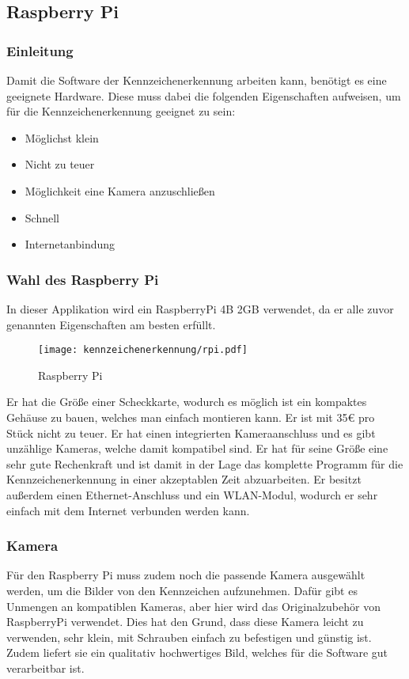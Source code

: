 \subsection{Raspberry Pi}

\subsubsection{Einleitung}
Damit die Software der Kennzeichenerkennung arbeiten kann, benötigt es eine geeignete Hardware. Diese muss dabei die folgenden Eigenschaften 
aufweisen, um für die Kennzeichenerkennung geeignet zu sein:

\begin{itemize}
    \item Möglichst klein
    \item Nicht zu teuer 
    \item Möglichkeit eine Kamera anzuschließen 
    \item Schnell 
    \item Internetanbindung
\end{itemize}

\subsubsection{Wahl des Raspberry Pi}
In dieser Applikation wird ein RaspberryPi 4B 2GB verwendet, da er alle zuvor genannten Eigenschaften am besten erfüllt.\\

\begin{figure}[H]
    \centering
    \texttt{[image: kennzeichenerkennung/rpi.pdf]}
    \caption{Raspberry Pi}
\end{figure}

Er hat die Größe einer Scheckkarte, wodurch es möglich ist ein kompaktes Gehäuse zu bauen, welches man einfach montieren kann. 
Er ist mit 35€ pro Stück nicht zu teuer. Er hat einen integrierten Kameraanschluss und es gibt unzählige Kameras, welche damit 
kompatibel sind. Er hat für seine Größe eine sehr gute Rechenkraft und ist damit in der Lage das komplette Programm für die 
Kennzeichenerkennung in einer akzeptablen Zeit abzuarbeiten. Er besitzt außerdem einen Ethernet-Anschluss und ein WLAN-Modul, 
wodurch er sehr einfach mit dem Internet verbunden werden kann.

\subsubsection{Kamera}
Für den Raspberry Pi muss zudem noch die passende Kamera ausgewählt werden, um die Bilder von den Kennzeichen aufzunehmen. 
Dafür gibt es Unmengen an kompatiblen Kameras, aber hier wird das Originalzubehör von RaspberryPi verwendet. Dies hat den Grund, 
dass diese Kamera leicht zu verwenden, sehr klein, mit Schrauben einfach zu befestigen und günstig ist. Zudem liefert sie ein 
qualitativ hochwertiges Bild, welches für die Software gut verarbeitbar ist.

